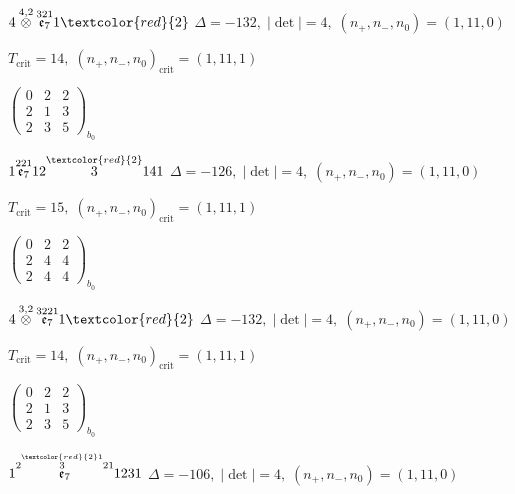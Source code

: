 \documentclass[10pt]{article}
\begin{document}
$4\overset{4,2}{\otimes}\overset{321}{\mathfrak{e}_7}1\textcolor{red}{2}$ \quad $\Delta=-132,\; |\det|=4,\; (n_+,n_-,n_0)=(1,11,0)$

\hspace{1em}$T_{\text{crit}}=14,\; (n_+,n_-,n_0)_{\text{crit}}=(1,11,1)$

\hspace{2em}$\left(\begin{smallmatrix}0 & 2 & 2 \\ 2 & 1 & 3 \\ 2 & 3 & 5\end{smallmatrix}\right)_{\!b_0}$

\smallskip

$1\overset{221}{\mathfrak{e}_7}12\overset{\textcolor{red}{2}}{3}141$ \quad $\Delta=-126,\; |\det|=4,\; (n_+,n_-,n_0)=(1,11,0)$

\hspace{1em}$T_{\text{crit}}=15,\; (n_+,n_-,n_0)_{\text{crit}}=(1,11,1)$

\hspace{2em}$\left(\begin{smallmatrix}0 & 2 & 2 \\ 2 & 4 & 4 \\ 2 & 4 & 4\end{smallmatrix}\right)_{\!b_0}$

\smallskip

$4\overset{3,2}{\otimes}\overset{3221}{\mathfrak{e}_7}1\textcolor{red}{2}$ \quad $\Delta=-132,\; |\det|=4,\; (n_+,n_-,n_0)=(1,11,0)$

\hspace{1em}$T_{\text{crit}}=14,\; (n_+,n_-,n_0)_{\text{crit}}=(1,11,1)$

\hspace{2em}$\left(\begin{smallmatrix}0 & 2 & 2 \\ 2 & 1 & 3 \\ 2 & 3 & 5\end{smallmatrix}\right)_{\!b_0}$

\smallskip

$1\overset{2\overset{\textcolor{red}{2}1}{3}21}{\mathfrak{e}_7}1231$ \quad $\Delta=-106,\; |\det|=4,\; (n_+,n_-,n_0)=(1,11,0)$
\end{document}
